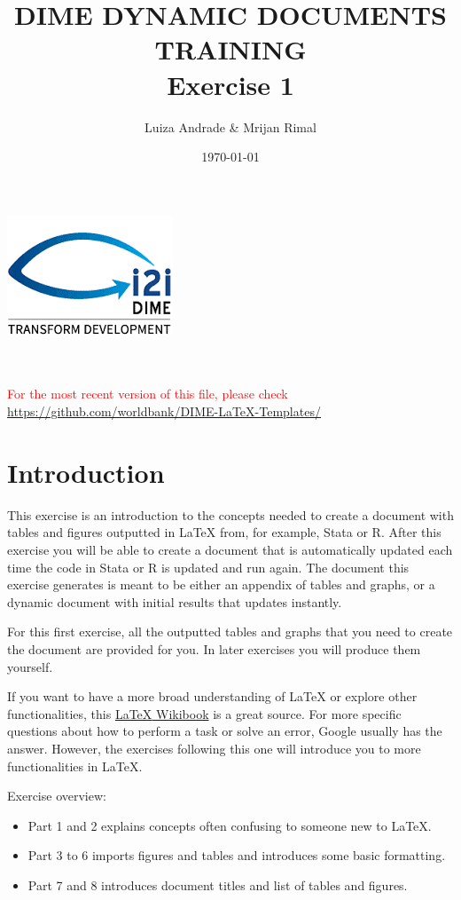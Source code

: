 \documentclass[12pts]{article}
\title{DIME DYNAMIC DOCUMENTS TRAINING \\ Exercise 1}
\author{Luiza Andrade \& Mrijan Rimal}
\date{\today}
\begin{document}
	
	
	\makeatletter
	\begin{titlepage}
		\begin{center}
			\includegraphics[width=0.3\linewidth]{../img/i2i.png}\\[10ex]
			{\LARGE \bfseries  \@title }\\[2ex] 
			{\Large  \@author}\\[20ex] 
			{\large \@date}
		\end{center}
		\vspace{5cm}
		\textcolor{red}{For the most recent version of this file, please check \url{https://github.com/worldbank/DIME-LaTeX-Templates/}}
	\end{titlepage}
	\makeatother
	
	\tableofcontents
	
	\newpage
	\section*{Introduction}
	
	This exercise is an introduction to the concepts needed to create a document with tables and figures outputted in {\LaTeX} from, for example, Stata or R. After this exercise you will be able to create a document that is automatically updated each time the code in Stata or R is updated and run again. The document this exercise generates is meant to be either an appendix of tables and graphs, or a dynamic document with initial results that updates instantly.
	
	For this first exercise, all the outputted tables and graphs that you need to create the document are provided for you. In later exercises you will produce them yourself.
	
	If you want to have a more broad understanding of {\LaTeX} or explore other functionalities, this \href{https://en.wikibooks.org/wiki/LaTeX
	}{{\LaTeX} Wikibook} is a great source. For more specific questions about how to perform a task or solve an error, Google usually has the answer. However, the exercises following this one will introduce you to more functionalities in {\LaTeX}.
	
	Exercise overview:
	\begin{itemize}
		\item Part 1 and 2 explains concepts often confusing to someone new to {\LaTeX}.
		\item Part 3 to 6 imports figures and tables and introduces some basic formatting.
		\item Part 7 and 8 introduces document titles and list of tables and figures.
	\end{itemize}
	
\end{document}

